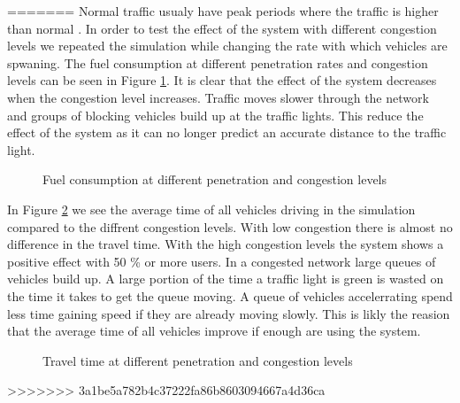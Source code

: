 =======
Normal traffic usualy have peak periods where the traffic is higher than normal \cite{Vejdir}. 
In order to test the effect of the system with different congestion levels we repeated the simulation while changing the rate with which vehicles are spwaning. 
The fuel consumption at different penetration rates and congestion levels can be seen in Figure \ref{fig:TestResults:congestionFuel}. 
It is clear that the effect of the system decreases when the congestion level increases. 
Traffic moves slower through the network and groups of blocking vehicles build up at the traffic lights. 
This reduce the effect of the system as it can no longer predict an accurate distance to the traffic light.
\begin{figure}[h]
\caption{Fuel consumption at different penetration and congestion levels}
\label{fig:TestResults:congestionFuel}
\end{figure}

In Figure \ref{fig:TestResults:congestionTime} we see the average time of all vehicles driving in the simulation compared to the diffrent congestion levels. 
With low congestion there is almost no difference in the travel time.
With the high congestion levels the system shows a positive effect with 50 \% or more users. 
In a congested network large queues of vehicles build up. 
A large portion of the time a traffic light is green is wasted on the time it takes to get the queue moving. 
A queue of vehicles accelerrating spend less time gaining speed if they are already moving slowly. 
This is likly the reasion that the average time of all vehicles improve if enough are using the system.
\begin{figure}[h]
\caption{Travel time at different penetration and congestion levels}
\label{fig:TestResults:congestionTime}
\end{figure}



>>>>>>> 3a1be5a782b4c37222fa86b8603094667a4d36ca
